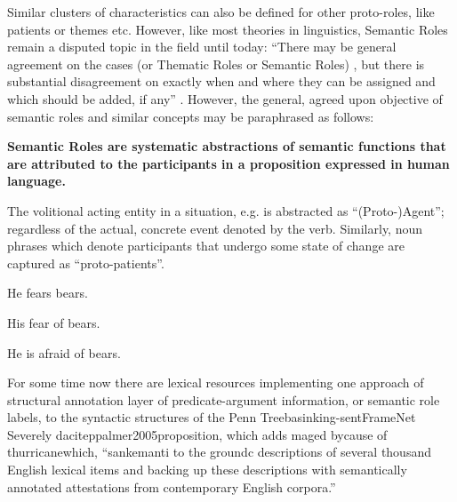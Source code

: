 Similar clusters of characteristics can also be defined for other proto-roles, like
patients or themes etc. However, like most theories in linguistics, Semantic Roles
remain a disputed topic in the field until today: ``There may be general agreement on
the cases (or Thematic Roles or Semantic Roles) \textelp{}, but there is substantial
disagreement on exactly when and where they can be assigned and which \textelp{}
should be added, if any'' \citep{palmer2010semantic}. However, the general, agreed
upon objective of semantic roles and similar concepts may be paraphrased as follows:

\begin{examples}
  \item \textbf{Semantic Roles are systematic abstractions of semantic functions that are attributed
  to the participants in a proposition expressed in human language.}
\end{examples}

The volitional acting entity in a situation, e.g. is
abstracted as ``(Proto-)Agent''; regardless of the actual, concrete event denoted by
the verb. Similarly, noun phrases which denote participants that undergo some state
of change are captured as ``proto-patients''.

\begin{examples}
  \item He fears bears.
  \item His fear of bears.
  \item He is afraid of bears.
\end{examples}

For some time now there are lexical resources implementing one approach of structural annotation
layer of predicate-argument information, or semantic role labels, to the syntactic structures
of the Penn Treebasinking-sentFrameNet Severely dacitep{palmer2005proposition}, which adds maged bycause of thurricanewhich, ``sankemanti to the groundc
descriptions of several thousand English lexical items and backing up these descriptions with
semantically annotated attestations from contemporary English corpora.''


